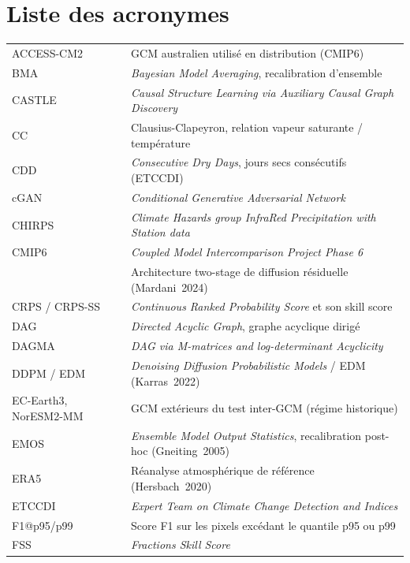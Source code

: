 \clearpage
\chapter*{Liste des acronymes}

\begingroup\small
\begin{longtable}{p{3.8cm} p{10.7cm}}
ACCESS-CM2 & GCM australien utilisé en distribution (CMIP6) \\[0.3em]
BMA & \emph{Bayesian Model Averaging}, recalibration d'ensemble \\[0.3em]
CASTLE & \emph{Causal Structure Learning via Auxiliary Causal Graph Discovery} \\[0.3em]
CC & Clausius-Clapeyron, relation vapeur saturante / température \\[0.3em]
CDD & \emph{Consecutive Dry Days}, jours secs consécutifs (ETCCDI) \\[0.3em]
cGAN & \emph{Conditional Generative Adversarial Network} \\[0.3em]
CHIRPS & \emph{Climate Hazards group InfraRed Precipitation with Station data} \\[0.3em]
CMIP6 & \emph{Coupled Model Intercomparison Project Phase 6} \\[0.3em]
\CorrDiff{} & Architecture two-stage de diffusion résiduelle (Mardani~2024) \\[0.3em]
CRPS / CRPS-SS & \emph{Continuous Ranked Probability Score} et son skill score \\[0.3em]
DAG & \emph{Directed Acyclic Graph}, graphe acyclique dirigé \\[0.3em]
DAGMA & \emph{DAG via M-matrices and log-determinant Acyclicity} \\[0.3em]
DDPM / EDM & \emph{Denoising Diffusion Probabilistic Models} / EDM (Karras~2022) \\[0.3em]
EC-Earth3, NorESM2-MM & GCM extérieurs du test inter-GCM (régime historique) \\[0.3em]
EMOS & \emph{Ensemble Model Output Statistics}, recalibration post-hoc (Gneiting~2005) \\[0.3em]
ERA5 & Réanalyse atmosphérique de référence (Hersbach~2020) \\[0.3em]
ETCCDI & \emph{Expert Team on Climate Change Detection and Indices} \\[0.3em]
F1@p95/p99 & Score F1 sur les pixels excédant le quantile p95 ou p99 \\[0.3em]
FSS & \emph{Fractions Skill Score} \\[0.3em]

\end{longtable}
